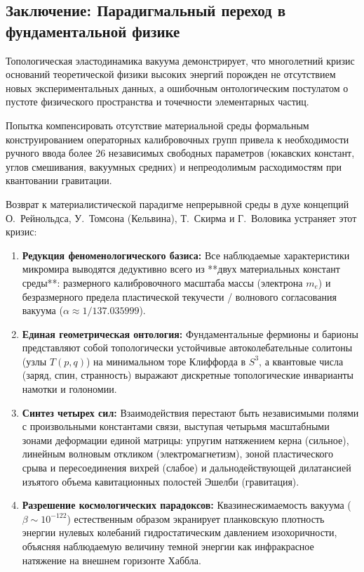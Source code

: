 \documentclass[11pt,a4paper]{article}
\theoremstyle{definition}
\theoremstyle{remark}
\begin{document}
\subsection{Заключение: Парадигмальный переход в фундаментальной физике}
Топологическая эластодинамика вакуума демонстрирует, что многолетний кризис оснований теоретической физики высоких энергий порожден не отсутствием новых экспериментальных данных, а ошибочным онтологическим постулатом о пустоте физического пространства и точечности элементарных частиц.

Попытка компенсировать отсутствие материальной среды формальным конструированием операторных калибровочных групп привела к необходимости ручного ввода более 26 независимых свободных параметров (юкавских констант, углов смешивания, вакуумных средних) и непреодолимым расходимостям при квантовании гравитации.

Возврат к материалистической парадигме непрерывной среды в духе концепций О.~Рейнольдса, У.~Томсона (Кельвина), Т.~Скирма и Г.~Воловика устраняет этот кризис:
\begin{enumerate}
    \item \textbf{Редукция феноменологического базиса:} Все наблюдаемые характеристики микромира выводятся дедуктивно всего из **двух материальных констант среды**: размерного калибровочного масштаба массы (электрона $m_e$) и безразмерного предела пластической текучести / волнового согласования вакуума ($\alpha \approx 1/137.035999$).
    \item \textbf{Единая геометрическая онтология:} Фундаментальные фермионы и барионы представляют собой топологически устойчивые автоколебательные солитоны (узлы $T(p,q)$) на минимальном торе Клиффорда в $S^3$, а квантовые числа (заряд, спин, странность) выражают дискретные топологические инварианты намотки и голономии.
    \item \textbf{Синтез четырех сил:} Взаимодействия перестают быть независимыми полями с произвольными константами связи, выступая четырьмя масштабными зонами деформации единой матрицы: упругим натяжением керна (сильное), линейным волновым откликом (электромагнетизм), зоной пластического срыва и пересоединения вихрей (слабое) и дальнодействующей дилатансией изъятого объема кавитационных полостей Эшелби (гравитация).
    \item \textbf{Разрешение космологических парадоксов:} Квазинесжимаемость вакуума ($\beta \sim 10^{-122}$) естественным образом экранирует планковскую плотность энергии нулевых колебаний гидростатическим давлением изохоричности, объясняя наблюдаемую величину темной энергии как инфракрасное натяжение на внешнем горизонте Хаббла.
\end{enumerate}
\end{document}
